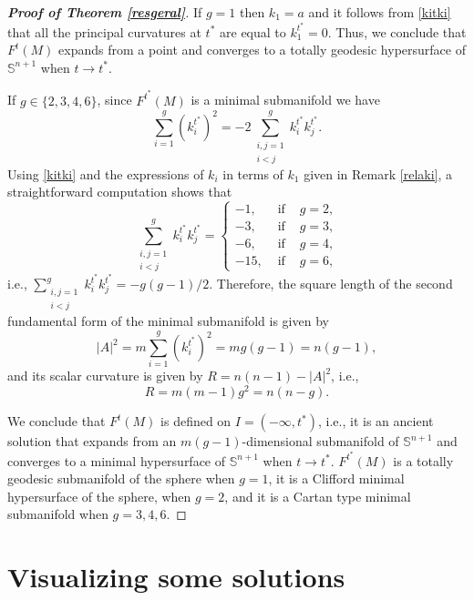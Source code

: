 \documentclass[11pt,a4paper,reqno]{amsproc}
\numberwithin{equation}{section}
\begin{document}
\begin{proof}[{\bf{Proof of Theorem \ref{resgeral}}}]
If $g=1$ then $k_1=a$ and it follows from \eqref{kitki} that all the principal curvatures at $t^*$ are equal to $k_1^{t^*}=0$.    
Thus, we conclude that  $ {F}^{t}(M)$ expands from a point and converges to a totally geodesic hypersurface of $\mathbb{S}^{n+1}$ when $t \rightarrow t^{*}$.



If $g\in\{ 2,3,4,6\}$,    
since $F^{t^*}(M)$ is a minimal submanifold we have 
\[
\sum_{i=1}^{g} (k_i^{t^*})^2= -2\sum_{\substack {i,j=1\\ i<j}}^g k_i^{t^*}k_j^{t^*}.
\] 
Using \eqref{kitki} and the expressions of $k_i$ in terms of $k_1$ given in Remark \ref{relaki}, a straightforward computation  shows that
\[
\sum_{\substack{i,j=1\\ i<j}}^g k_i^{t^*}k_j^{t^*}=
  \left\{
\begin{array}{lcl}
-1, & \mbox{  if }& g=2,\\
-3, & \mbox{  if }& g=3,\\
-6,  & \mbox{  if }& g=4,\\
-15,& \mbox{  if } & g=6,    
\end{array}
\right.
\] 
i.e.,  $\sum_{\substack{i,j=1\\ i<j}}^g k_i^{t^*}k_j^{t^*}=-g(g-1)/2$. 
Therefore, the square length of the second fundamental form of the minimal submanifold is given by
\[
|A|^2= m\sum_{i=1}^{g} (k_i^{t^*})^2= m g(g-1)=n(g-1), 
\] 
and its scalar curvature is given by $R=n(n-1)-|A|^2$, i.e.,   
\[
R=m(m-1)g^2=n(n-g). 
\]

We conclude that ${F}^{t}(M)$ is defined on $I=(-\infty,t^{*})$, i.e., 
it is an ancient solution that expands from an $m(g-1)$-dimensional submanifold of $\mathbb{S}^{n+1}$ and converges to a minimal hypersurface of $\mathbb{S}^{n+1}$ when $t \longrightarrow t^{*}$.
${F}^{t^*}(M)$ is a totally geodesic submanifold of the sphere when $g=1$, it is a Clifford minimal hypersurface of the sphere, when $g=2$,  and it is a Cartan type minimal submanifold when $g= 3,4, 6$.       

\end{proof}



 \section{Visualizing some solutions}\label{visual}
\end{document}
